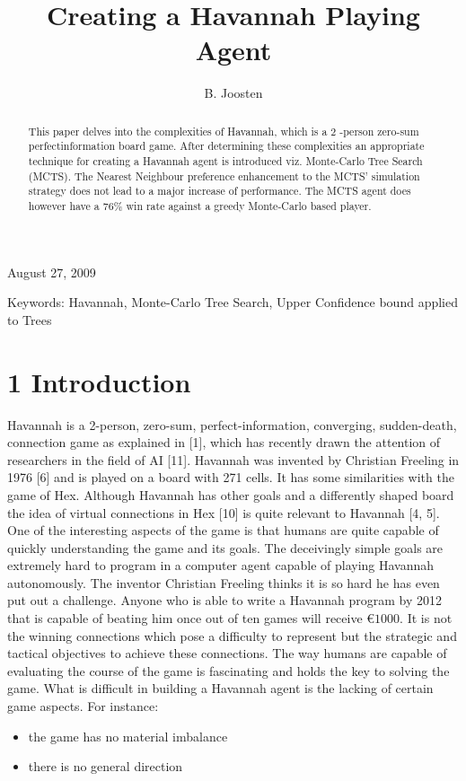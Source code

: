 \documentclass[10pt]{article}
\title{Creating a Havannah Playing Agent }
\author{B. Joosten}
\date{}
\begin{document}
\maketitle
August 27, 2009

\begin{abstract}
This paper delves into the complexities of Havannah, which is a 2 -person zero-sum perfectinformation board game. After determining these complexities an appropriate technique for creating a Havannah agent is introduced viz. Monte-Carlo Tree Search (MCTS). The Nearest Neighbour preference enhancement to the MCTS' simulation strategy does not lead to a major increase of performance. The MCTS agent does however have a $76 \%$ win rate against a greedy Monte-Carlo based player.
\end{abstract}

Keywords: Havannah, Monte-Carlo Tree Search, Upper Confidence bound applied to Trees

\section*{1 Introduction}
Havannah is a 2-person, zero-sum, perfect-information, converging, sudden-death, connection game as explained in [1], which has recently drawn the attention of researchers in the field of AI [11]. Havannah was invented by Christian Freeling in 1976 [6] and is played on a board with 271 cells. It has some similarities with the game of Hex. Although Havannah has other goals and a differently shaped board the idea of virtual connections in Hex [10] is quite relevant to Havannah [4, 5]. One of the interesting aspects of the game is that humans are quite capable of quickly understanding the game and its goals. The deceivingly simple goals are extremely hard to program in a computer agent capable of playing Havannah autonomously. The inventor Christian Freeling thinks it is so hard he has even put out a challenge. Anyone who is able to write a Havannah program by 2012 that is capable of beating him once out of ten games will receive $€ 1000$. It is not the winning connections which pose a difficulty to represent but the strategic and tactical objectives to achieve these connections. The way humans are capable of evaluating the course of the game is fascinating and holds the key to solving the game. What is difficult in building a Havannah agent is the lacking of certain game aspects. For instance:

\begin{itemize}
  \item the game has no material imbalance
  \item there is no general direction
\end{itemize}
\end{document}
